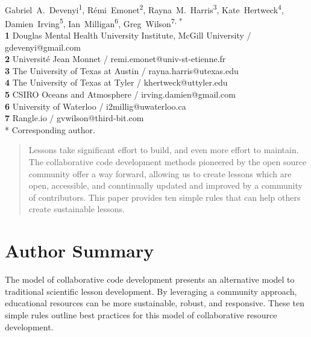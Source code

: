 \documentclass[10pt,letterpaper]{article}
\date{}
\begin{document}
\vspace*{0.2in}

\begin{flushleft}
{\Large
\textbf{}
}
\newline
\\
{Gabriel~A.~Devenyi}\textsuperscript{1},
{R\'{e}mi~Emonet}\textsuperscript{2},
{Rayna~M.~Harris}\textsuperscript{3},
{Kate~Hertweck}\textsuperscript{4},
{Damien~Irving}\textsuperscript{5},
{Ian~Milligan}\textsuperscript{6},
{Greg~Wilson}\textsuperscript{7, *}
\\
\textbf{1} Douglas Mental Health University Institute, McGill University / gdevenyi@gmail.com \\
\textbf{2} Universit\'{e} Jean Monnet / remi.emonet@univ-st-etienne.fr \\
\textbf{3} The University of Texas at Austin / rayna.harris@utexas.edu \\
\textbf{4} The University of Texas at Tyler / khertweck@uttyler.edu \\
\textbf{5} CSIRO Oceans and Atmosphere / irving.damien@gmail.com \\
\textbf{6} University of Waterloo / i2millig@uwaterloo.ca \\
\textbf{7} Rangle.io / gvwilson@third-bit.com
\\
* Corresponding author.
\end{flushleft}

\begin{abstract}

\noindent
Lessons take significant effort to build,
and even more effort to maintain.
The collaborative code development methods pioneered by the open source community
offer a way forward,
allowing us to create lessons which are open,
accessible,
and conntinually updated and improved by a community of contributors.
This paper provides ten simple rules that can help others create sustainable lessons.

\end{abstract}

\section*{Author Summary}

The model of collaborative code development presents an 
alternative model to traditional scientific lesson 
development. By leveraging a community approach, educational 
resources can be more sustainable, robust, and responsive. 
These ten simple rules outline best practices for this model of 
collaborative resource development.
\end{document}
